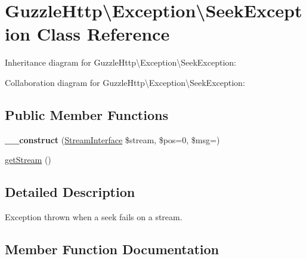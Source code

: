 \hypertarget{classGuzzleHttp_1_1Exception_1_1SeekException}{}\section{Guzzle\+Http\textbackslash{}Exception\textbackslash{}Seek\+Exception Class Reference}
\label{classGuzzleHttp_1_1Exception_1_1SeekException}


Inheritance diagram for Guzzle\+Http\textbackslash{}Exception\textbackslash{}Seek\+Exception\+:


Collaboration diagram for Guzzle\+Http\textbackslash{}Exception\textbackslash{}Seek\+Exception\+:
\subsection*{Public Member Functions}
\begin{DoxyCompactItemize}
\item 
\mbox{\label{classGuzzleHttp_1_1Exception_1_1SeekException_a35691741469b0c2cf3a010fd04f4baa1}} 
{\bfseries \+\_\+\+\_\+construct} (\hyperlink{interfacePsr_1_1Http_1_1Message_1_1StreamInterface}{Stream\+Interface} \$stream, \$pos=0, \$msg=\textquotesingle{}\textquotesingle{})
\item 
\hyperlink{classGuzzleHttp_1_1Exception_1_1SeekException_a23fa960361e67808b9b0f907544018ee}{get\+Stream} ()
\end{DoxyCompactItemize}


\subsection{Detailed Description}
Exception thrown when a seek fails on a stream. 

\subsection{Member Function Documentation}
\mbox{\label{classGuzzleHttp_1_1Exception_1_1SeekException_a23fa960361e67808b9b0f907544018ee}} 
